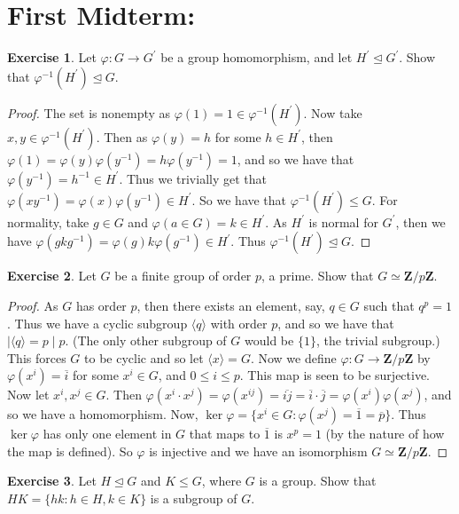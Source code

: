 \documentclass[9pt,reqno]{amsart}
\theoremstyle{definition}
\newtheorem{exercise}{Exercise}[section]
\newcommand{\zz}{\mathbf Z}
\newcommand{\pp}{\prime}
\begin{document}
\section{First Midterm:}
\begin{exercise} Let $\varphi \colon G \to G^\pp$ be a group homomorphism, and let $H^\pp \trianglelefteq G^\pp $. Show that $\varphi^{-1} (H^\pp) \trianglelefteq G$. 
\end{exercise}
\begin{proof}
The set is nonempty as $\varphi (1) =1 \in \varphi^{-1} (H^\pp)$.  Now take $x, y \in \varphi^{-1} (H^\pp)$. Then as $\varphi (y) = h$ for some $h \in H^\pp$, then $\varphi (1) = \varphi(y) \varphi(y^{-1}) =h \varphi(y^{-1} )=  1$, and so we have that $\varphi(y^{-1}) = h^{-1} \in H^\pp$. Thus we trivially get that $\varphi (xy^{-1}) = \varphi (x) \varphi(y^{-1}) \in H^\pp$. So we have that $\varphi^{-1} (H^\pp) \leq G$. For normality, take $g \in G$ and $\varphi(a \in G) = k \in H^\pp$. As $H^\pp$ is normal for $G^\pp$,  then we have $\varphi (gkg^{-1} ) = \varphi (g) k \varphi(g^{-1}) \in H^\pp$. Thus $\varphi^{-1} (H^\pp) \trianglelefteq G$. 
\end{proof}
\begin{exercise}
	Let $G$ be a finite group of order $p$, a prime. Show that $G \simeq \zz/ p \zz$.
\end{exercise}
\begin{proof}
	As $G$ has order $p$, then there exists an element, say, $q \in G$ such that $q^p = 1$. Thus we have a cyclic subgroup $ \langle q \rangle $ with order $p$, and so we have that $ | \langle q \rangle = p \mid p$. (The only other subgroup of $G$ would be $ \{ 1 \}$, the trivial subgroup.) This forces $G$ to be cyclic and so let $\langle x \rangle = G$. Now we define $\varphi \colon G \to \zz / p \zz$ by $\varphi (x^i) = \overline{i}$ for some $x^i \in G$, and $0 \leq i \leq p$. This map is seen to be surjective. Now let $x^i, x^j \in G$. Then $\varphi (x^i \cdot x^j) = \varphi(x^{ij}) = \overline{ij} = \overline{i} \cdot  \overline{j} = \varphi (x^i) \varphi(x^j)$, and so we have a homomorphism. Now, $\ker \varphi = \{ x^i \in G \colon \varphi(x^j) = \overline{1} = \overline{p} \}$. Thus $\ker \varphi$ has only one element in $G$ that maps to $\overline{1}$ is $x^p = 1$ (by the nature of how the map is defined). So $\varphi$ is injective and we have an isomorphism $ G \simeq \zz / p \zz$. 
\end{proof}
\begin{exercise}
	Let $H \trianglelefteq G$ and $K \leq G$, where $G$ is a group. Show that $HK = \{ hk \colon h \in H, k \in K \}$ is a subgroup of $G$. 
\end{exercise}
\end{document}
